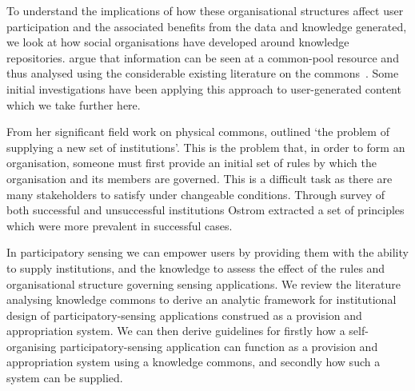 To understand the implications of how these organisational structures affect user participation and the associated benefits from the data and knowledge generated, we look at how social organisations have developed around knowledge repositories.
 argue that information can be seen at a common-pool resource and thus analysed using the considerable existing literature on the commons~\cite{Hess2007}. 
Some initial investigations have been applying this approach to user-generated content~\cite{Pitt2012} which we take further here.

From her significant field work on physical commons,  outlined `the problem of supplying a new set of institutions'. 
This is the problem that, in order to form an organisation, someone must first provide an initial set of rules by which the organisation and its members are governed.
This is a difficult task as there are many stakeholders to satisfy under changeable conditions. Through survey of both successful and unsuccessful institutions Ostrom extracted a set of principles which were more prevalent in successful cases.

In participatory sensing we can empower users by providing them with the ability to supply institutions, and the knowledge to assess the effect of the rules and organisational structure governing sensing applications. 
We review the literature analysing knowledge commons to derive an analytic framework for institutional design of participatory-sensing applications construed as a provision and appropriation system.  %
We can then derive guidelines for firstly how a self-organising participatory-sensing application can function as a provision and appropriation system using a knowledge commons, and secondly how such a system can be supplied.



